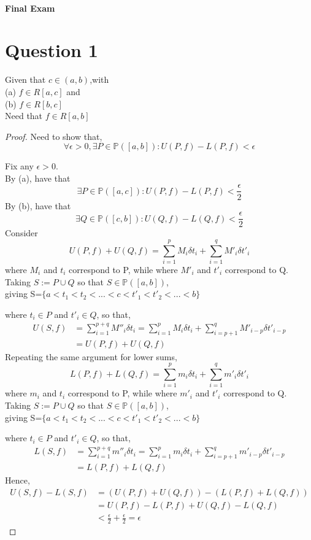 \documentclass[20pt,a4paper]{extarticle} %
\theoremstyle{definition}
\theoremstyle{definition}
\begin{document}
\paragraph{Final Exam}

\section*{Question 1}
Given that $c \in (a,b)$,with \\(a) $f \in R[a,c]$ and \\(b) $f \in R[b,c]$\\
Need that $f \in R[a,b]$
\begin{proof}
	Need to show that,
	\[ \forall \epsilon > 0, \exists P \in \mathbb{P}([a,b]) : U(P,f) - L(P,f) < \epsilon \]

	Fix any $\epsilon>0$.\\
	By (a), have that
	\[ \exists P \in \mathbb{P}([a,c]) : U(P,f) - L(P,f) < \frac{\epsilon}{2} \]
	By (b), have that
	\[ \exists Q \in \mathbb{P}([c,b]) : U(Q,f) - L(Q,f) < \frac{\epsilon}{2}\]
	Consider
	\[ U(P,f)+U(Q,f)= \sum_{i=1}^{p}M_i \delta t_i + \sum_{i=1}^{q}M'_i \delta t'_i   \]
	where $M_i$ and $t_i$ correspond to P, while where $M'_i$ and $t'_i$ correspond to Q.
	\newpage
	Taking $S:= P \cup Q$ so that $S \in \mathbb{P}([a,b]) $,\\
	giving S=$\{a<t_1<t_2<...<c<t'_1<t'_2<...<b\}$

	where $t_i \in P$ and $t'_i \in Q$, so that,\\
	\begin{align*}
		U(S,f)&= \sum_{i=1}^{p+q}M''_i \delta t_i=
		\sum_{i=1}^{p}M_i \delta t_i + \sum_{i=p+1}^{q}M'_{i-p} \delta t'_{i-p} \\
		      & =U(P,f)+U(Q,f)
	\end{align*}
	Repeating the same argument for lower sums,
	\[ L(P,f)+L(Q,f)= \sum_{i=1}^{p}m_i \delta t_i + \sum_{i=1}^{q}m'_i \delta t'_i   \]
	where $m_i$ and $t_i$ correspond to P, while where $m'_i$ and $t'_i$ correspond to Q.
	Taking $S:= P \cup Q$ so that $S \in \mathbb{P}([a,b]) $,\\
	giving S=$\{a<t_1<t_2<...<c<t'_1<t'_2<...<b\}$

	where $t_i \in P$ and $t'_i \in Q$, so that,\\
	\begin{align*}
		L(S,f)&= \sum_{i=1}^{p+q}m''_i \delta t_i=
		\sum_{i=1}^{p}m_i \delta t_i + \sum_{i=p+1}^{q}m'_{i-p} \delta t'_{i-p} \\
		      & =L(P,f)+L(Q,f)
	\end{align*}
	Hence,
	\begin{align*}
		U(S,f) - L(S,f) &= (U(P,f)+U(Q,f)) - (L(P,f)+L(Q,f))\\
				&= U(P,f)-L(P,f) + U(Q,f)-L(Q,f)\\
				&< \frac{\epsilon}{2}+\frac{\epsilon}{2}= \epsilon
	\end{align*}
\end{proof}
\newpage
\end{document}
